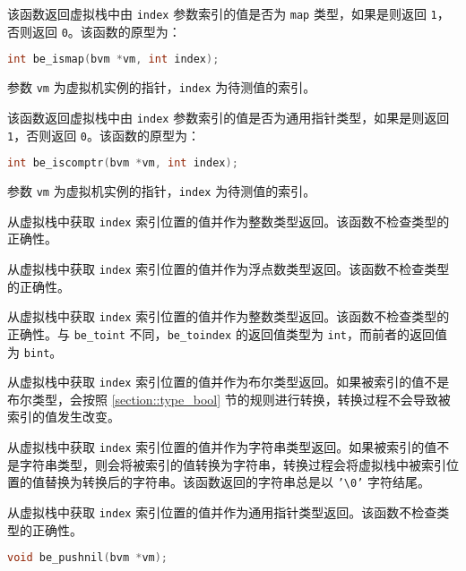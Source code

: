 
该函数返回虚拟栈中由 \texttt{index} 参数索引的值是否为 \texttt{map} 类型，如果是则返回 \texttt{1}，否则返回 \texttt{0}。该函数的原型为：
\begin{lstlisting}[language=c, style=berry, numbers=none]
int be_ismap(bvm *vm, int index);
\end{lstlisting}
参数 \texttt{vm} 为虚拟机实例的指针，\texttt{index} 为待测值的索引。


该函数返回虚拟栈中由 \texttt{index} 参数索引的值是否为通用指针类型，如果是则返回 \texttt{1}，否则返回 \texttt{0}。该函数的原型为：
\begin{lstlisting}[language=c, style=berry, numbers=none]
int be_iscomptr(bvm *vm, int index);
\end{lstlisting}
参数 \texttt{vm} 为虚拟机实例的指针，\texttt{index} 为待测值的索引。


从虚拟栈中获取 \texttt{index} 索引位置的值并作为整数类型返回。该函数不检查类型的正确性。


从虚拟栈中获取 \texttt{index} 索引位置的值并作为浮点数类型返回。该函数不检查类型的正确性。


从虚拟栈中获取 \texttt{index} 索引位置的值并作为整数类型返回。该函数不检查类型的正确性。与 \texttt{be\_toint} 不同，\texttt{be\_toindex} 的返回值类型为 \texttt{int}，而前者的返回值为 \texttt{bint}。


从虚拟栈中获取 \texttt{index} 索引位置的值并作为布尔类型返回。如果被索引的值不是布尔类型，会按照 \ref{section::type_bool} 节的规则进行转换，转换过程不会导致被索引的值发生改变。


从虚拟栈中获取 \texttt{index} 索引位置的值并作为字符串类型返回。如果被索引的值不是字符串类型，则会将被索引的值转换为字符串，转换过程会将虚拟栈中被索引位置的值替换为转换后的字符串。该函数返回的字符串总是以 \texttt{'\textbackslash 0'} 字符结尾。


从虚拟栈中获取 \texttt{index} 索引位置的值并作为通用指针类型返回。该函数不检查类型的正确性。


\begin{lstlisting}[language=c, style=berry, numbers=none]
void be_pushnil(bvm *vm);
\end{lstlisting}

